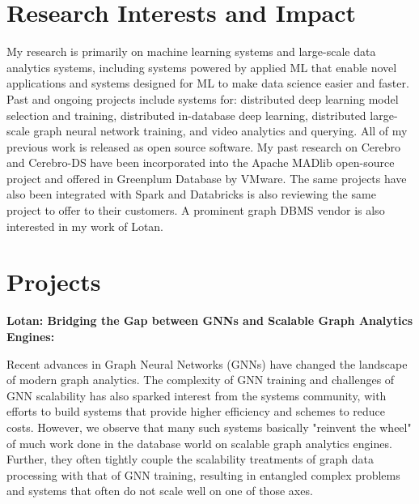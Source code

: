 \documentclass[margin,line]{res}
\begin{document}
\begin{resume}
\section{\sc Research Interests and Impact}
My research is primarily on machine learning systems and large-scale data analytics systems, including systems powered by applied ML that enable novel applications and systems designed for ML to make data science easier and faster. Past and ongoing projects include systems for: distributed deep learning model selection and training, distributed in-database deep learning, distributed large-scale graph neural network training, and video analytics and querying. All of my previous work is released as open source software. My past research on Cerebro and Cerebro-DS have been incorporated into the Apache MADlib open-source project and offered in Greenplum Database by VMware. The same projects have also been integrated with Spark and Databricks is also reviewing the same project to offer to their customers. A prominent graph DBMS vendor is also interested in my work of Lotan.

\section{\sc Projects}
{\bf Lotan: Bridging the Gap between GNNs and Scalable Graph Analytics Engines:}

Recent advances in Graph Neural Networks (GNNs) have changed the landscape of modern graph analytics. The complexity of GNN training and challenges of GNN scalability has also sparked interest from the systems community, with efforts to build systems that provide higher efficiency and schemes to reduce costs. However, we observe that many such systems basically "reinvent the wheel" of much work done in the database world on scalable graph analytics engines. Further, they often tightly couple the scalability treatments of graph data processing with that of GNN training, resulting in entangled complex problems and systems that  often do not scale well on one of those axes.


\end{resume}
\end{document}
